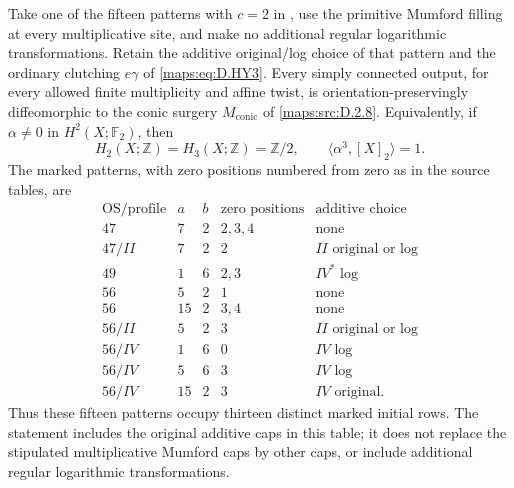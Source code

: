 \begin{theorem}[the fifteen minimal $c=2$ patterns]
Take one of the fifteen patterns with $c=2$ in
, use the primitive
Mumford filling at every multiplicative site, and make no additional
regular logarithmic transformations. Retain the additive original/log
choice of that pattern and the ordinary clutching $e\gamma$ of
\eqref{maps:eq:D.HY3}. Every simply connected output, for every allowed finite
multiplicity and affine twist, is orientation-preservingly diffeomorphic
to the conic surgery $M_{\mathrm{conic}}$ of \ref{maps:src:D.2.8}. Equivalently, if
$\alpha\ne0$ in $H^2(X;\mathbb F_2)$, then
\[
 H_2(X;\mathbb Z)=H_3(X;\mathbb Z)=\mathbb Z/2,
 \qquad \langle\alpha^3,[X]_2\rangle=1.                 \tag{D.C21}\label{maps:eq:D.C21}
\]
The marked patterns, with zero positions numbered from zero as in the
source tables, are
\[
\begin{array}{c|r|r|l|l}
\text{OS/profile}&a&b&\text{zero positions}&\text{additive choice}\\\hline
47&7&2&2,3,4&\text{none}\\
47/II&7&2&2&II\text{ original or log}\\
49&1&6&2,3&IV^*\text{ log}\\
56&5&2&1&\text{none}\\
56&15&2&3,4&\text{none}\\
56/II&5&2&3&II\text{ original or log}\\
56/IV&1&6&0&IV\text{ log}\\
56/IV&5&6&3&IV\text{ log}\\
56/IV&15&2&3&IV\text{ original}.
\end{array}                                                   \tag{D.C22}\label{maps:eq:D.C22}
\]
Thus these fifteen patterns occupy thirteen distinct marked initial
rows. The statement includes the original additive caps in this table;
it does not replace the stipulated multiplicative Mumford caps by
other caps, or include additional regular logarithmic transformations.

\end{theorem}


